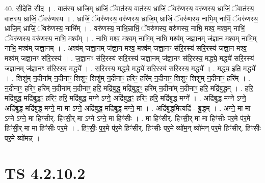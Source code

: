 \documentclass[17pt]{extarticle}
\begin{document}
40. सी॒देति॑ सीद । . वात॑स्य॒ ध्राजि॒म् ध्राजिं॒ ॅवात॑स्य॒ वात॑स्य॒ ध्राजिं॒ ॅवरु॑णस्य॒ वरु॑णस्य॒ ध्राजिं॒ ॅवात॑स्य॒ वात॑स्य॒ ध्राजिं॒ ॅवरु॑णस्य । . ध्राजिं॒ ॅवरु॑णस्य॒ वरु॑णस्य॒ ध्राजि॒म् ध्राजिं॒ ॅवरु॑णस्य॒ नाभि॒म् नाभिं॒ ॅवरु॑णस्य॒ ध्राजि॒म् ध्राजिं॒ ॅवरु॑णस्य॒ नाभि᳚म् । . वरु॑णस्य॒ नाभि॒न्नाभिं॒ ॅवरु॑णस्य॒ वरु॑णस्य॒ नाभि॒ मश्व॒ मश्व॒म् नाभिं॒ ॅवरु॑णस्य॒ वरु॑णस्य॒ नाभि॒ मश्व᳚म् । . नाभि॒ मश्व॒ मश्व॒म् नाभि॒म् नाभि॒ मश्व॑म् जज्ञा॒नम् ज॑ज्ञा॒न मश्व॒म् नाभि॒म् नाभि॒ मश्व॑म् जज्ञा॒नम् । . अश्व॑म् जज्ञा॒नम् ज॑ज्ञा॒न मश्व॒ मश्व॑म् जज्ञा॒नꣳ स॑रि॒रस्य॑ सरि॒रस्य॑ जज्ञा॒न मश्व॒ मश्व॑म् जज्ञा॒नꣳ स॑रि॒रस्य॑ । . ज॒ज्ञा॒नꣳ स॑रि॒रस्य॑ सरि॒रस्य॑ जज्ञा॒नम् ज॑ज्ञा॒नꣳ स॑रि॒रस्य॒ मद्ध्ये॒ मद्ध्ये॑ सरि॒रस्य॑ जज्ञा॒नम् ज॑ज्ञा॒नꣳ स॑रि॒रस्य॒ मद्ध्ये᳚ । . स॒रि॒रस्य॒ मद्ध्ये॒ मद्ध्ये॑ सरि॒रस्य॑ सरि॒रस्य॒ मद्ध्ये᳚ । . मद्ध्य॒ इति॒ मद्ध्ये᳚ । . शिशु॑म् न॒दीना᳚म् न॒दीनाꣳ॒॒ शिशुꣳ॒॒ शिशु॑म् न॒दीनाꣳ॒॒ हरिꣳ॒॒ हरि॑म् न॒दीनाꣳ॒॒ शिशुꣳ॒॒ शिशु॑म् न॒दीनाꣳ॒॒ हरि᳚म् । . न॒दीनाꣳ॒॒ हरिꣳ॒॒ हरि॑म् न॒दीना᳚म् न॒दीनाꣳ॒॒ हरि॒ मद्रि॑बुद्ध॒ मद्रि॑बुद्धꣳ॒॒ हरि॑म् न॒दीना᳚म् न॒दीनाꣳ॒॒ हरि॒ मद्रि॑बुद्धम् । . हरि॒ मद्रि॑बुद्ध॒ मद्रि॑बुद्धꣳ॒॒ हरिꣳ॒॒ हरि॒ मद्रि॑बुद्ध॒ मग्ने ऽग्ने॒ अद्रि॑बुद्धꣳ॒॒ हरिꣳ॒॒ हरि॒ मद्रि॑बुद्ध॒ मग्ने᳚ । . अद्रि॑बुद्ध॒ मग्ने ऽग्ने॒ अद्रि॑बुद्ध॒ मद्रि॑बुद्ध॒ मग्ने॒ मा मा ऽग्ने॒ अद्रि॑बुद्ध॒ मद्रि॑बुद्ध॒ मग्ने॒ मा । . अद्रि॑बुद्ध॒मित्यद्रि॑ - बु॒द्ध॒म् । . अग्ने॒ मा मा ऽग्ने ऽग्ने॒ मा हिꣳ॑सीर्. हिꣳसी॒र् मा ऽग्ने ऽग्ने॒ मा हिꣳ॑सीः । . मा हिꣳ॑सीर्. हिꣳसी॒र् मा मा हिꣳ॑सीः पर॒मे प॑र॒मे हिꣳ॑सी॒र् मा मा हिꣳ॑सीः पर॒मे । . हिꣳ॒॒सीः॒ प॒र॒मे प॑र॒मे हिꣳ॑सीर्. हिꣳसीः पर॒मे व्यो॑म॒न् व्यो॑मन् पर॒मे हिꣳ॑सीर्. हिꣳसीः पर॒मे व्यो॑मन्न् । \newline
\pagebreak
{}

\section{ TS 4.2.10.2 }
\end{document}
